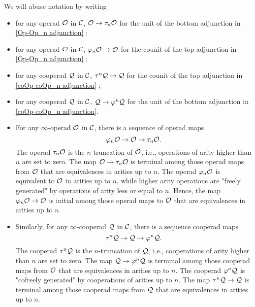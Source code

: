 \begin{notation}
	We will abuse notation by writing 
	\begin{itemize}
	    \item 
	    for any operad ${\mathcal{O}}$ in ${\mathcal{C}}$,
	${\mathcal{O}} \to \tau_{n} {\mathcal{O}}$
	for the unit of the bottom adjunction in \eqref{Op-Op_n adjunction} ;
	\item 
	for any operad ${\mathcal{O}}$ in ${\mathcal{C}}$,
	$
	\varphi_n {\mathcal{O}} \to {\mathcal{O}}
	$ for the counit of the top adjunction in \eqref{Op-Op_n adjunction} ;
	\item 	for any cooperad ${\mathcal{Q}}$ in ${\mathcal{C}}$, $\tau^n {\mathcal{Q}} \to {\mathcal{Q}}$ for the counit of the top adjunction in \eqref{coOp-coOp_n adjunction} ;
	\item 	
	for any cooperad ${\mathcal{Q}}$ in ${\mathcal{C}}$, 
	$
	{\mathcal{Q}} \to \varphi^n {\mathcal{Q}}
	$
	for the unit of the bottom adjunction in \eqref{coOp-coOp_n adjunction}.
	\end{itemize}
\end{notation}

\begin{remark}
\begin{itemize}
	\item For any $\infty$-operad ${\mathcal{O}}$ in ${\mathcal{C}}$, there is a sequence of operad maps
	\[
	\varphi_n{\mathcal{O}} \to {\mathcal{O}} \to \tau_n {\mathcal{O}}.
	\]
	The operad $\tau_n{\mathcal{O}}$ is the $n$-truncation of ${\mathcal{O}}$, i.e., operations of arity higher than $n$ are set to zero.
	The map ${\mathcal{O}} \to \tau_n {\mathcal{O}}$ is terminal among those operad maps from ${\mathcal{O}}$ that are equivalences in arities up to $n$.
	The operad $\varphi_n{\mathcal{O}}$ is equivalent to ${\mathcal{O}}$ in arities up to $n$, while higher arity operations are "freely generated" by operations of arity less or equal to $n$.
	Hence, the map $\varphi_n{\mathcal{O}} \to {\mathcal{O}}$ is initial among those operad maps to ${\mathcal{O}}$ that are equivalences in arities up to $n$.

	\item Similarly, for any $\infty$-cooperad ${\mathcal{Q}}$ in ${\mathcal{C}}$, there is a sequence cooperad maps
	\[
	\tau^n {\mathcal{Q}} \to {\mathcal{Q}} \to \varphi^n {\mathcal{Q}}.
	\]
	The cooperad $\tau^n{\mathcal{Q}}$ is the $n$-truncation of ${\mathcal{Q}}$, i.e., cooperations of arity higher than $n$ are set to zero. The map ${\mathcal{Q}} \to \varphi^n{\mathcal{Q}}$ is terminal among those cooperad maps from ${\mathcal{O}}$ that are equivalences in arities up to $n$.
    The cooperad $\varphi^n {\mathcal{Q}}$ is "cofreely generated" by cooperations of arities up to $n$.
    The map $\tau^n{\mathcal{Q}} \to {\mathcal{Q}}$ is terminal among those cooperad maps from ${\mathcal{Q}}$ that are equivalences in arities up to $n$.
\end{itemize}
\end{remark}

